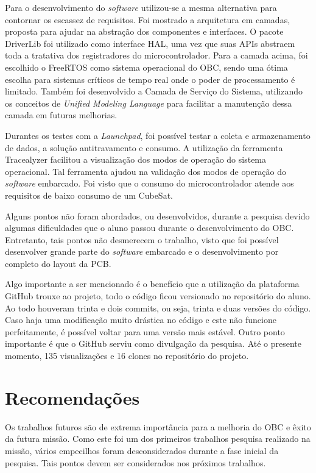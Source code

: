 Para o desenvolvimento do \textit{software} utilizou-se a mesma alternativa para contornar os escassez de requisitos. Foi mostrado a arquitetura em camadas, proposta para ajudar na abstração dos componentes e interfaces. O pacote DriverLib foi utilizado como interface HAL, uma vez que suas APIs abstraem toda a tratativa dos registradores do microcontrolador. Para a camada acima, foi escolhido o FreeRTOS como sistema operacional do OBC, sendo uma ótima escolha para sistemas críticos de tempo real onde o poder de processamento é limitado. Também foi desenvolvido a Camada de Serviço do Sistema, utilizando os conceitos de \textit{Unified Modeling Language} para facilitar a manutenção dessa camada em futuras melhorias. 

Durantes os testes com a \textit{Launchpad}, foi possível testar a coleta e armazenamento de dados, a solução antitravamento e consumo. A utilização da ferramenta Tracealyzer facilitou a visualização dos modos de operação do sistema operacional. Tal ferramenta ajudou na validação dos modos de operação do \textit{software} embarcado. Foi visto que o consumo do microcontrolador atende aos requisitos de baixo consumo de um CubeSat.    

Alguns pontos não foram abordados, ou desenvolvidos, durante a pesquisa devido algumas dificuldades que o aluno passou durante o desenvolvimento do OBC. Entretanto, tais pontos não desmerecem o trabalho, visto que foi possível desenvolver grande parte do \textit{software} embarcado e o desenvolvimento por completo do layout da PCB. %

Algo importante a ser mencionado é o benefício que a utilização da plataforma GitHub trouxe ao projeto, todo o código ficou versionado no repositório do aluno. Ao todo houveram trinta e dois commits, ou seja, trinta e duas versões do código. Caso haja uma modificação muito drástica no código e este não funcione perfeitamente, é possível voltar para uma versão mais estável. Outro ponto importante é que o GitHub serviu como divulgação da pesquisa. Até o presente momento, 135 visualizações e 16 clones no repositório do projeto.  


\section{Recomendações}
\label{Recomendações}
Os trabalhos futuros são de extrema importância para a melhoria do OBC e êxito da futura missão. Como este foi um dos primeiros trabalhos pesquisa realizado na missão, vários empecilhos foram desconsiderados durante a fase inicial da pesquisa. Tais pontos devem ser considerados nos próximos trabalhos.

